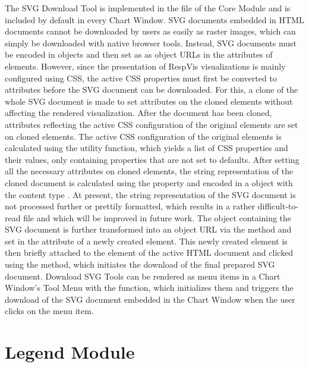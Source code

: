 The SVG Download Tool is implemented in the
 file of the Core Module and is
included by default in every Chart Window. SVG documents embedded in
HTML documents cannot be downloaded by users as easily as raster
images, which can simply be downloaded with native browser tools.
Instead, SVG documents must be encoded in  objects and then
set as as object URLs in the  attributes of 
elements. However, since the presentation of RespVis visualizations is
mainly configured using CSS, the active CSS properties must first be
converted to attributes before the SVG document can be downloaded.
For this, a clone of the whole SVG document is made to set attributes
on the cloned elements without affecting the rendered visualization.
After the document has been cloned, attributes reflecting the active
CSS configuration of the original elements are set on cloned elements.
The active CSS configuration of the original elements is calculated
using the  utility function,
which yields a list of CSS properties and their values, only
containing properties that are not set to defaults. After setting all
the necessary attributes on cloned elements, the string representation
of the cloned document is calculated using the
 property and encoded in a  object
with the content type . At present, the string
representation of the SVG document is not processed further or
prettily formatted, which results in a rather difficult-to-read file
and which will be improved in future work. The  object
containing the SVG document is further transformed into an object URL
via the  method and set in the 
attribute of a newly created  element. This newly created
 element is then briefly attached to the 
element of the active HTML document and clicked using the
 method, which initiates the download of the final
prepared SVG document. Download SVG Tools can be rendered as menu
items in a Chart Window's Tool Menu with the
 function, which initializes them and
triggers the download of the SVG document embedded in the Chart Window
when the user clicks on the menu item.





\section{Legend Module}

